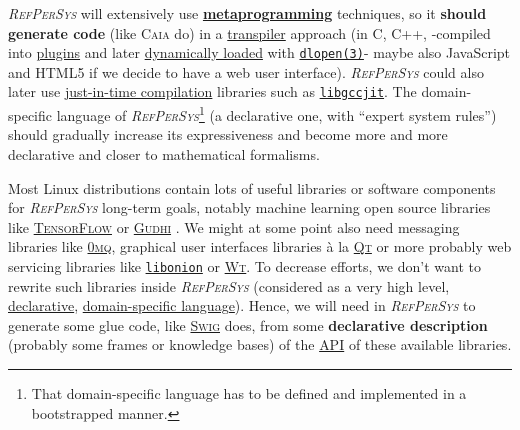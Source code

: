 \documentclass[11pt,a4paper,svgnames]{article}
\newcommand{\RefPerSys}{{\textit{\textsc{RefPerSys}}}}
\begin{document}
{\RefPerSys} will extensively use
\href{https://en.wikipedia.org/wiki/Metaprogramming}{\textbf{metaprogramming}}
techniques, so it \textbf{should generate code} (like \textsc{Caia}
do) in a
\href{https://en.wikipedia.org/wiki/Source-to-source_compiler}{transpiler}
approach (in C, C++, -compiled into
\href{https://en.wikipedia.org/wiki/Plug-in\_(computing)}{plugins} and
later
\href{https://en.wikipedia.org/wiki/Dynamic\_loading}{dynamically
  loaded} with \href{}{\texttt{dlopen(3)}}- maybe also JavaScript and
HTML5 if we decide to have a web user interface). {\RefPerSys} could
also later use
\href{https://en.wikipedia.org/wiki/Just-in-time_compilation}{just-in-time
  compilation} libraries such as
\href{https://gcc.gnu.org/onlinedocs/jit/}{\texttt{libgccjit}}. The
domain-specific language of \RefPerSys\footnote{That domain-specific
language has to be defined and implemented in a bootstrapped manner.}
(a declarative one, with ``expert system rules'') should gradually
increase its expressiveness and become more and more declarative and
closer to mathematical formalisms.

Most Linux distributions contain lots of useful libraries or software
components for {\RefPerSys} long-term goals, notably machine learning
open source libraries like
\href{https://www.tensorflow.org/}{\textsc{TensorFlow}}
\cite{charniak:2019:deep-learning} or
\href{https://gudhi.inria.fr/}{\textsc{Gudhi}}
\cite{chazal:2016:high}. We might at some point also need messaging
libraries like \href{https://zeromq.org/}{\textsc{0mq}}, graphical
user interfaces libraries à la \href{http://qt.io/}{\textsc{Qt}} or
more probably web servicing libraries like
\href{https://github.com/davidmoreno/onion/}{\texttt{libonion}} or
\href{https://www.webtoolkit.eu/wt}{\textsc{Wt}}. To decrease efforts,
we don't want to rewrite such libraries inside {\RefPerSys} (considered
as a very high level,
\href{https://en.wikipedia.org/wiki/Declarative\_programming}{declarative},
\href{https://en.wikipedia.org/wiki/Domain-specific\_language}{domain-specific
  language}). Hence, we will need in {\RefPerSys} to generate some
glue code, like \href{http://swig.org/}{\textsc{Swig}} does, from some
\textbf{declarative description} (probably some frames or knowledge
bases) of the
\href{https://en.wikipedia.org/wiki/Application_programming_interface}{API}
of these available libraries.
\end{document}
